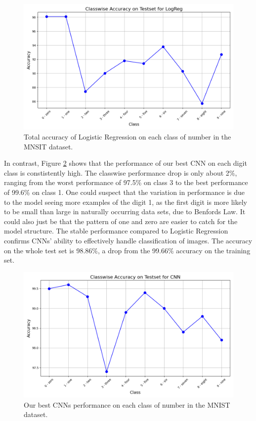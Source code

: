 \begin{figure}[H]
    \centering
    \includegraphics[width=\textwidth]{results/evaluation/LogReg_classwise_acc.png}
    \caption{Total accuracy of Logistic Regression on each class of number in the MNSIT dataset.}
    \label{fig:ClasswiseAccuracyLogReg}
\end{figure}
In contrast, Figure \ref{fig:ClasswiseAccuracyCNN} shows that the performance of our best CNN on each digit class is constistently high. The classwise performance drop is only about 2\%, ranging from the worst performance of 97.5\% on class 3 to the best performance of 99.6\% on class 1. One could suspect that the variation in performance is due to the model seeing more examples of the digit 1, as the first digit is more likely to be small than large in naturally occurring data sets, due to Benfords Law. It could also just be that the pattern of one and zero are easier to catch for the model structure. The stable performance compared to Logistic Regression confirms CNNs' ability to effectively handle classification of images. The accuracy on the whole test set is 98.86\%, a drop from the 99.66\% accuracy on the training set.
\begin{figure}[H]
    \centering
    \includegraphics[width=\linewidth]{results/evaluation/CNN_classwise_acc.png}
    \caption{Our best CNNs performance on each class of number in the MNIST dataset.}
    \label{fig:ClasswiseAccuracyCNN}
\end{figure}

